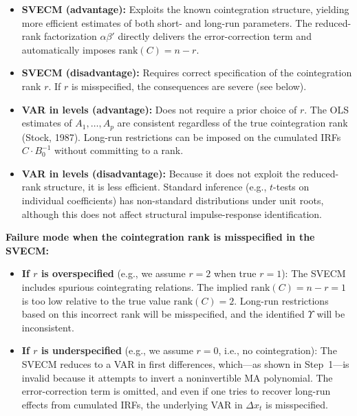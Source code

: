 \documentclass[12pt]{article}
\newcommand{\rank}{\mathrm{rank}}
\theoremstyle{definition}
\begin{document}
\begin{itemize}
    \item \textbf{SVECM (advantage):} Exploits the known cointegration structure, yielding more efficient estimates of both short- and long-run parameters. The reduced-rank factorization $\alpha\beta'$ directly delivers the error-correction term and automatically imposes $\rank(C) = n - r$.

    \item \textbf{SVECM (disadvantage):} Requires correct specification of the cointegration rank $r$. If $r$ is misspecified, the consequences are severe (see below).

    \item \textbf{VAR in levels (advantage):} Does not require a prior choice of $r$. The OLS estimates of $A_1,\ldots,A_p$ are consistent regardless of the true cointegration rank (Stock, 1987). Long-run restrictions can be imposed on the cumulated IRFs $C \cdot B_0^{-1}$ without committing to a rank.

    \item \textbf{VAR in levels (disadvantage):} Because it does not exploit the reduced-rank structure, it is less efficient. Standard inference (e.g., $t$-tests on individual coefficients) has non-standard distributions under unit roots, although this does not affect structural impulse-response identification.
\end{itemize}

\medskip
\noindent \textbf{Failure mode when the cointegration rank is misspecified in the SVECM:}
\begin{itemize}
    \item \textbf{If $r$ is overspecified} (e.g., we assume $r = 2$ when true $r = 1$): The SVECM includes spurious cointegrating relations. The implied $\rank(C) = n - r = 1$ is too low relative to the true value $\rank(C) = 2$. Long-run restrictions based on this incorrect rank will be misspecified, and the identified $\Upsilon$ will be inconsistent.

    \item \textbf{If $r$ is underspecified} (e.g., we assume $r = 0$, i.e., no cointegration): The SVECM reduces to a VAR in first differences, which---as shown in Step~1---is invalid because it attempts to invert a noninvertible MA polynomial. The error-correction term is omitted, and even if one tries to recover long-run effects from cumulated IRFs, the underlying VAR in $\Delta x_t$ is misspecified.
\end{itemize}
\end{document}
